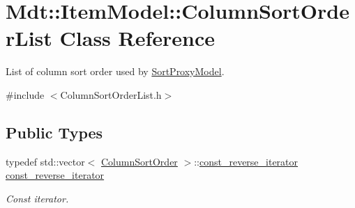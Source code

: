 \hypertarget{class_mdt_1_1_item_model_1_1_column_sort_order_list}{}\section{Mdt\+:\+:Item\+Model\+:\+:Column\+Sort\+Order\+List Class Reference}
\label{class_mdt_1_1_item_model_1_1_column_sort_order_list}


List of column sort order used by \hyperlink{class_mdt_1_1_item_model_1_1_sort_proxy_model}{Sort\+Proxy\+Model}.  




{\ttfamily \#include $<$Column\+Sort\+Order\+List.\+h$>$}

\subsection*{Public Types}
\begin{DoxyCompactItemize}
\item 
typedef std\+::vector$<$ \hyperlink{class_mdt_1_1_item_model_1_1_column_sort_order}{Column\+Sort\+Order} $>$\+::\hyperlink{class_mdt_1_1_item_model_1_1_column_sort_order_list_a84f457fc1e69a2c87ac86d71cdff7c97}{const\+\_\+reverse\+\_\+iterator} \hyperlink{class_mdt_1_1_item_model_1_1_column_sort_order_list_a84f457fc1e69a2c87ac86d71cdff7c97}{const\+\_\+reverse\+\_\+iterator}\hypertarget{class_mdt_1_1_item_model_1_1_column_sort_order_list_a84f457fc1e69a2c87ac86d71cdff7c97}{}\label{class_mdt_1_1_item_model_1_1_column_sort_order_list_a84f457fc1e69a2c87ac86d71cdff7c97}

\begin{DoxyCompactList}\small\item\em Const iterator. \end{DoxyCompactList}\end{DoxyCompactItemize}
